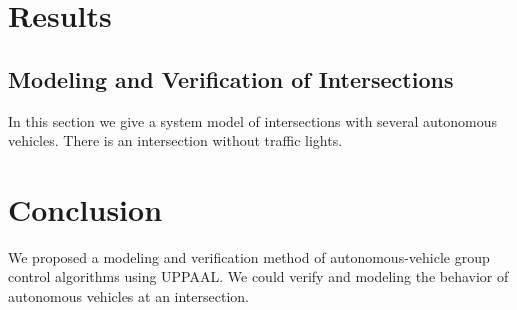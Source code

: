\documentclass[]{article}
\begin{document}
\section{Results}
	\subsection{Modeling and Verification of Intersections}
		In this section we give a system model of intersections with several autonomous vehicles.  There is an intersection without traffic lights.
\section{Conclusion}
	We proposed a modeling and verification method of autonomous-vehicle group control algorithms using UPPAAL. We could verify and modeling the behavior of autonomous vehicles at an intersection.
\begin{thebibliography}{1}
\end{thebibliography}
\end{document}
